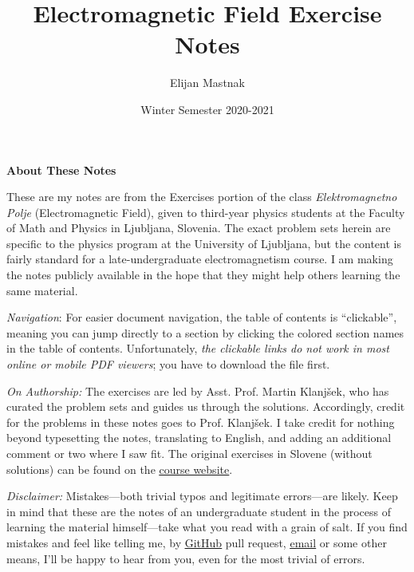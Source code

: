 \documentclass[11pt, a4paper]{article}
\begin{document}
\title{Electromagnetic Field Exercise Notes}
\author{Elijan Mastnak}
\date{Winter Semester 2020-2021}
\maketitle

\begin{center}
\textbf{About These Notes}
\end{center}
These are my notes are from the Exercises portion of the class \textit{Elektromagnetno Polje} (Electromagnetic Field), given to third-year physics students at the Faculty of Math and Physics in Ljubljana, Slovenia. The exact problem sets herein are specific to the physics program at the University of Ljubljana, but the content is fairly standard for a late-undergraduate electromagnetism course. I am making the notes publicly available in the hope that they might help others learning the same material.

\vspace{2mm}
\textit{Navigation}: For easier document navigation, the table of contents is ``clickable'', meaning you can jump directly to a section by clicking the colored section names in the table of contents. Unfortunately, \textit{the clickable links do not work in most online or mobile PDF viewers}; you have to download the file first.

\vspace{2mm}
\textit{On Authorship:} 
The exercises are led by Asst. Prof. Martin Klanj\v{s}ek, who has curated the problem sets and guides us through the solutions. Accordingly, credit for the problems in these notes goes to Prof. Klanj\v{s}ek. I take credit for nothing beyond typesetting the notes, translating to English, and adding an additional comment or two where I saw fit. The original exercises in Slovene (without solutions) can be found on the \href{https://www-f5.ijs.si/emp-2020-2021.html}{\underline{course website}}. 

\vspace{2mm}
\textit{Disclaimer:} Mistakes---both trivial typos and legitimate errors---are likely. Keep in mind that these are the notes of an undergraduate student in the process of learning the material himself---take what you read with a grain of salt. If you find mistakes and feel like telling me, by \href{https://github.com/ejmastnak/fmf}{\underline{GitHub}} pull request, \href{mailto:ejmastnak@gmail.com}{\underline{email}} or some other means, I'll be happy to hear from you, even for the most trivial of errors.
\end{document}
